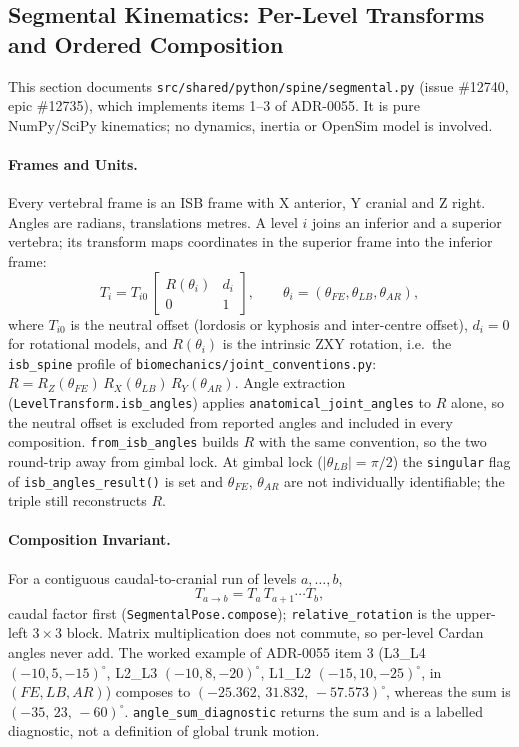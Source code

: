 \subsection{Segmental Kinematics: Per-Level Transforms and Ordered Composition}
\label{sec:spn-1b}

This section documents \texttt{src/shared/python/spine/segmental.py} (issue
\#12740, epic \#12735), which implements items 1--3 of ADR-0055. It is pure
NumPy/SciPy kinematics; no dynamics, inertia or OpenSim model is involved.

\paragraph{Frames and Units.}
Every vertebral frame is an ISB frame with X anterior, Y cranial and Z right.
Angles are radians, translations metres. A level $i$ joins an inferior and a
superior vertebra; its transform maps coordinates in the superior frame into
the inferior frame:
\[
  T_i = T_{i0}\,\begin{bmatrix} R(\theta_i) & d_i \\ 0 & 1 \end{bmatrix},
  \qquad \theta_i = (\theta_{FE},\theta_{LB},\theta_{AR}),
\]
where $T_{i0}$ is the neutral offset (lordosis or kyphosis and inter-centre
offset), $d_i = 0$ for rotational models, and $R(\theta_i)$ is the intrinsic
ZXY rotation, i.e.\ the \texttt{isb\_spine} profile of
\texttt{biomechanics/joint\_conventions.py}:
$R = R_Z(\theta_{FE})\,R_X(\theta_{LB})\,R_Y(\theta_{AR})$. Angle extraction
(\texttt{LevelTransform.isb\_angles}) applies \texttt{anatomical\_joint\_angles}
to $R$ alone, so the neutral offset is excluded from reported angles and
included in every composition. \texttt{from\_isb\_angles} builds $R$ with the
same convention, so the two round-trip away from gimbal lock. At gimbal lock
($|\theta_{LB}|=\pi/2$) the \texttt{singular} flag of
\texttt{isb\_angles\_result()} is set and $\theta_{FE}$, $\theta_{AR}$ are not
individually identifiable; the triple still reconstructs $R$.

\paragraph{Composition Invariant.}
For a contiguous caudal-to-cranial run of levels $a,\dots,b$,
\[
  T_{a\to b} = T_a\,T_{a+1}\cdots T_b ,
\]
caudal factor first (\texttt{SegmentalPose.compose}); \texttt{relative\_rotation}
is the upper-left $3\times3$ block. Matrix multiplication does not commute,
so per-level Cardan angles never add. The worked example of ADR-0055 item 3
(L3\_L4 $(-10,5,-15)^\circ$, L2\_L3 $(-10,8,-20)^\circ$, L1\_L2
$(-15,10,-25)^\circ$, in $(FE,LB,AR)$) composes to
$(-25.362,\,31.832,\,-57.573)^\circ$, whereas the sum is
$(-35,\,23,\,-60)^\circ$. \texttt{angle\_sum\_diagnostic} returns the sum and is
a labelled diagnostic, not a definition of global trunk motion.

